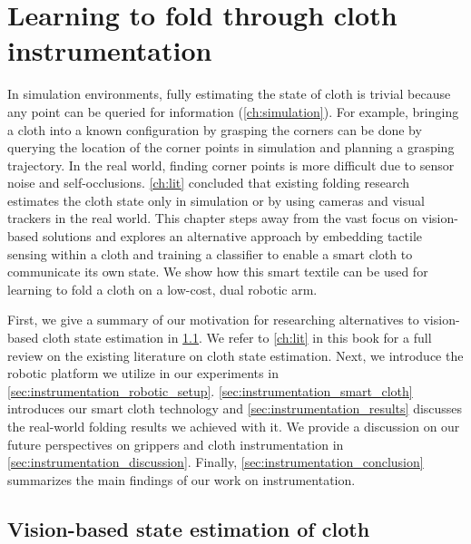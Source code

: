 \documentclass[\home/main.tex]{subfiles}
\begin{document}
\chapter{Learning to fold through cloth instrumentation}\label{ch:instrumentation}

In simulation environments, fully estimating the state of cloth is trivial because any point can be queried for information (\cref{ch:simulation}).
For example, bringing a cloth into a known configuration by grasping the corners can be done by querying the location of the corner points in simulation and planning a grasping trajectory.
In the real world, finding corner points is more difficult due to sensor noise and self-occlusions. \cref{ch:lit} concluded that existing folding research estimates the cloth state only in simulation or by using cameras and visual trackers in the real world. This chapter steps away from the vast focus on vision-based solutions and explores an alternative approach by embedding tactile sensing within a cloth and training a classifier to enable a smart cloth to communicate its own state. We show how this smart textile can be used for learning to fold a cloth on a low-cost, dual robotic arm.

First, we give a summary of our motivation for researching alternatives to vision-based cloth state estimation in \cref{sec:instrumentation_lit}. We refer to \cref{ch:lit} in this book for a full review on the existing literature on cloth state estimation. Next, we introduce the robotic platform we utilize in our experiments in \cref{sec:instrumentation_robotic_setup}. \cref{sec:instrumentation_smart_cloth} introduces our smart cloth technology and \cref{sec:instrumentation_results} discusses the real-world folding results we achieved with it.
We provide a discussion on our future perspectives on grippers and cloth instrumentation in \cref{sec:instrumentation_discussion}.
Finally, \cref{sec:instrumentation_conclusion} summarizes the main findings of our work on instrumentation.

\section{Vision-based state estimation of cloth} \label{sec:instrumentation_lit}
\end{document}
